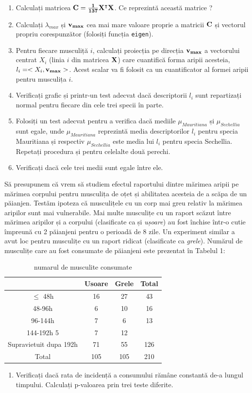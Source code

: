 \documentclass[]{article}
\providecommand{\tightlist}{%
  \setlength{\itemsep}{0pt}\setlength{\parskip}{0pt}}
\def\l{{\lambda}}
\begin{document}
\begin{enumerate}
\def\labelenumi{\arabic{enumi}.}
\item
  Calculați matricea \(\bf{C}=\frac{1}{137}\bf{X}^\intercal\bf{X}\). Ce
  reprezintă această matrice ?
\item
  Calculați \(\l_{max}\) și \(\bf{v}_{max}\) cea mai mare valoare
  proprie a matricii \(\bf{C}\) și vectorul propriu corespunzător
  (folosiți funcția \texttt{eigen}).
\item
  Pentru fiecare musculiță \(i\), calculați proiecția pe direcția
  \(\bf{v}_{max}\) a vectorului centrat \(X_i\) (linia \(i\) din
  matricea \(\bf{X}\)) care cuantifică forma aripii acesteia,
  \(l_i = <X_i, \bf{v}_{max}>\). Acest scalar va fi folosit ca un
  cuantificator al formei aripii pentru musculița \(i\).
\item
  Verificați grafic și printr-un test adecvat dacă descriptorii \(l_i\)
  sunt repartizați normal pentru fiecare din cele trei specii în parte.
\item
  Folosiți un test adecvat pentru a verifica dacă mediile
  \(\mu_{Mauritiana}\) și \(\mu_{Sechellia}\) sunt egale, unde
  \(\mu_{Mauritiana}\) reprezintă media descriptorilor \(l_i\) pentru
  specia Mauritiana și respectiv \(\mu_{Sechellia}\) este media lui
  \(l_i\) pentru specia Sechellia. Repetați procedura și pentru
  celelalte două perechi.
\item
  Verificați dacă cele trei medii sunt egale între ele.
\end{enumerate}

Să presupunem că vrem să studiem efectul raportului dintre mărimea
aripii pe mărimea corpului pentru musculița de oțet și abilitatea
acesteia de a scăpa de un păianjen. Testăm ipoteza că musculițele cu un
corp mai greu relativ la mărimea aripilor sunt mai vulnerabile. Mai
multe musculițe cu un raport scăzut între mărimea aripilor și a corpului
(clasificate ca și \emph{ușoare}) au fost închise într-o cutie împreună
cu 2 păianjeni pentru o perioadă de 8 zile. Un experiment similar a avut
loc pentru musculițe cu un raport ridicat (clasificate ca \emph{grele}).
Numărul de musculițe care au fost consumate de păianjeni este prezentat
în Tabelul 1:

\begin{table}[ht]
\caption {numarul de musculite consumate}
  \begin{center}

    \begin{tabular}{c|c|c|c}
        & Usoare & Grele & Total\\
        \hline
      $\leq$ 48h & 16 & 27 & 43\\
      48-96h & 6 & 10 & 16 \\
      96-144h & 7 & 6 & 13 \\
      144-192h 5 & 7 & 12 \\
      \hline
      Supravietuit dupa 192h & 71 & 55 & 126\\
      \hline
      Total & 105 & 105 & 210
    \end{tabular}
  \end{center}
\end{table}

\begin{enumerate}
\def\labelenumi{\arabic{enumi}.}
\setcounter{enumi}{6}
\tightlist
\item
  Verificați dacă rata de incidență a consumului rămâne constantă de-a
  lungul timpului. Calculați p-valoarea prin trei teste diferite.
\end{enumerate}
\end{document}
